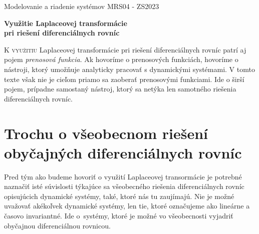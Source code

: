 \documentclass[a4paper, 10pt, ]{article}
\def\oznacenieCasti{MRS04 - ZS2023}
\begin{document}
\lstset{%
style=mystyle,
rangebeginprefix=\#\#\#\ cellB\ ,%
rangebeginsuffix=\ \#\#\#,%
rangeendprefix=\#\#\#\ cellE\ ,%
rangeendsuffix=\ \#\#\#,%
includerangemarker=false,
}




\fontsize{12pt}{22pt}\selectfont

\centerline{\textsf{Modelovanie a riadenie systémov} \hfill \textsf{\oznacenieCasti}}

\fontsize{18pt}{22pt}\selectfont





\begin{flushleft}
	\textbf{\textsf{Využitie Laplaceovej transformácie\\pri riešení diferenciálnych rovníc}}
\end{flushleft}





\normalsize

\bigskip

{\hypersetup{hidelinks}

\tableofcontents

}

\bigskip

\vspace{18pt}





\lettrine[lines=3, nindent=0pt]{K}{ využitiu} Laplaceovej transformácie pri riešení diferenciálnych rovníc patrí aj pojem \emph{prenosová funkcia}. Ak hovoríme o prenosových funkciách, hovoríme o nástroji, ktorý umožňuje analyticky pracovať s dynamickými systémami. V tomto texte však nie je cieľom priamo sa zaoberať prenosovými funkciami. Ide o širší pojem, prípadne samostaný nástroj, ktorý sa netýka len samotného riešenia diferenciálnych rovníc.


\section[Trochu o všeobecnom riešení obyčajných diferenciálnych rovníc]{Trochu o všeobecnom riešení\\obyčajných diferenciálnych rovníc}
\label{predchcasttato}


Pred tým ako budeme hovoriť o využití Laplaceovej transormácie je potrebné naznačiť isté súvislosti týkajúce sa všeobecného riešenia diferenciálnych rovníc opisujúcich dynamické systémy, také, ktoré nás tu zaujímajú. Nie je možné uvažovať akékoľvek dynamické systémy, len tie, ktoré označujeme ako lineárne a časovo invariantné. Ide o~systémy, ktoré je možné vo všeobecnosti vyjadriť obyčajnou diferenciálnou rovnicou.
\end{document}
